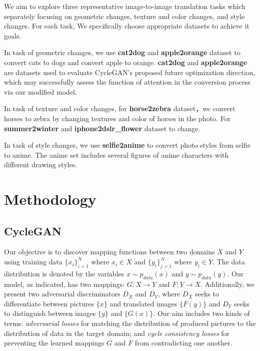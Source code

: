 \documentclass{article}
\begin{document}
We aim to explore three representative image-to-image translation tasks which separately focusing on geometric changes, texture and color changes, and style changes. For each task, We specifically choose appropriate datasets to achieve it goals. 

In task of geometric changes, we use \textbf{cat2dog} and \textbf{apple2orange} dataset to convert cats to dogs and convert apple to orange. \textbf{cat2dog} and \textbf{apple2orange} are datasets used to evaluate CycleGAN's proposed future optimization direction, which may successfully assess the function of attention in the conversion process via our modified model. 

In task of texture and color changes, for \textbf{horse2zebra} dataset，we convert horses to zebra by changing textures and color of horses in the photo. For \textbf{summer2winter} and \textbf{iphone2dslr\_flower} dataset to change.

In task of style changes, we use \textbf{selfie2anime} to convert photo styles from selfie to anime. The anime set includes several figures of anime characters with different drawing styles.


\section{Methodology}

\subsection{CycleGAN}
Our objective is to discover mapping functions between two domains $\textit{X}$ and $\textit{Y}$ using training data  $\{x_i\}^{N}_{i=1}$ where $x_i \in X$ and $\{y_i\}^{N}_{j=1}$ where $y_i \in Y$. The data distribution is denoted by the variables $x \sim p_{data}(x)$ and $y \sim p_{data}(y)$. Our model, as indicated, has two mappings: $G: X \rightarrow Y$ and $F: Y \rightarrow X$. Additionally, we present two adversarial discriminators $D_X$ and $D_Y$, where $D_X$ seeks to differentiate between pictures $\{x\}$ and translated images $\{F(y)\}$ and $D_Y$ seeks to distinguish between images $\{y\}$ and $\{G(x)\}$. Our aim includes two kinds of terms: \textit{adversarial losses} for matching the distribution of produced pictures to the distribution of data in the target domain; and \textit{cycle consistency losses} for preventing the learned mappings $\textit{G}$ and $\textit{F}$ from contradicting one another.
\end{document}
